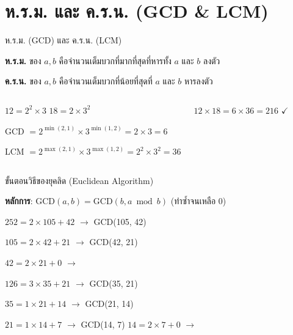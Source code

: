 \documentclass[11pt, aspectratio=169]{beamer}
\begin{document}
\section{ห.ร.ม. และ ค.ร.น. (GCD \& LCM)}

\begin{frame}{ห.ร.ม. (GCD) และ ค.ร.น. (LCM)}
  \begin{explanation}[นิยาม]
    \textbf{ห.ร.ม.} ของ $a, b$ คือจำนวนเต็มบวกที่มากที่สุดที่หารทั้ง $a$ และ $b$ ลงตัว

    \textbf{ค.ร.น.} ของ $a, b$ คือจำนวนเต็มบวกที่น้อยที่สุดที่ $a$ และ $b$ หารลงตัว
  \end{explanation}

  \begin{columns}[T]
      \begin{exambox}
        $12 = 2^2 \times 3$ \quad $18 = 2 \times 3^2$

        GCD $= 2^{\min(2,1)} \times 3^{\min(1,2)} = 2 \times 3 = 6$

        LCM $= 2^{\max(2,1)} \times 3^{\max(1,2)} = 2^2 \times 3^2 = 36$
      \end{exambox}
      \begin{explanation}[สูตรสำคัญ]

        $12 \times 18 = 6 \times 36 = 216$ \quad $\checkmark$
      \end{explanation}
  \end{columns}
\end{frame}

\begin{frame}{ขั้นตอนวิธีของยุคลิด (Euclidean Algorithm)}
  \begin{explanation}
    \textbf{หลักการ}: $\text{GCD}(a,b) = \text{GCD}(b, a \bmod b)$ \quad (ทำซํ้าจนเหลือ $0$)
  \end{explanation}

  \begin{exambox}
    $252 = 2 \times 105 + 42$ \quad $\rightarrow$ \quad GCD(105, 42)

    $105 = 2 \times 42 + 21$ \quad $\rightarrow$ \quad GCD(42, 21)

    $42 = 2 \times 21 + 0$ \quad $\rightarrow$ \quad {}
  \end{exambox}

  \begin{exambox}
    $126 = 3 \times 35 + 21$ \quad $\rightarrow$ \quad GCD(35, 21)

    $35 = 1 \times 21 + 14$ \quad $\rightarrow$ \quad GCD(21, 14)

    $21 = 1 \times 14 + 7$ \quad $\rightarrow$ \quad GCD(14, 7) \qquad $14 = 2 \times 7 + 0$ \quad $\rightarrow$ \quad {}
  \end{exambox}
\end{frame}
\end{document}
